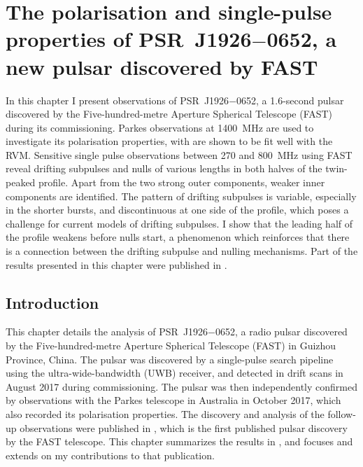 \chapter[The polarisation and single-pulse properties of \texorpdfstring{PSR~J1926$-$0652}{PSR~J12926--0652}]{The polarisation and single-pulse properties of \texorpdfstring{PSR~J1926$-$0652}{PSR~J12926--0652}, a new pulsar discovered by FAST}
\label{chapt: J1926}

In this chapter I present observations of PSR~J1926$-$0652, a 1.6-second pulsar discovered by the Five-hundred-metre Aperture Spherical Telescope (FAST) during its commissioning. Parkes observations at 1400~MHz are used to investigate its polarisation properties, with are shown to be fit well with the RVM. Sensitive single pulse observations between 270 and 800~MHz using FAST reveal drifting subpulses and nulls of various lengths in both halves of the twin-peaked profile. Apart from the two strong outer components, weaker inner components are identified.  The pattern of drifting subpulses is variable, especially in the shorter bursts, and discontinuous at one side of the profile, which poses a challenge for current models of drifting subpulses. I show that the leading half of the profile weakens before nulls start, a phenomenon which reinforces that there is a connection between the drifting subpulse and nulling mechanisms. Part of the results presented in this chapter were published in \citet{ZLH+2019}.

\section{Introduction}
\label{sec: J1926 - intro}

This chapter details the analysis of PSR~J1926$-$0652, a radio pulsar discovered by the Five-hundred-metre Aperture Spherical Telescope (FAST) in Guizhou Province, China. The pulsar was discovered by a single-pulse search pipeline \citep{ZBM+2014} using the ultra-wide-bandwidth (UWB) receiver, and detected in drift scans in August 2017 during commissioning. The pulsar was then independently confirmed by observations with the Parkes telescope in Australia in October 2017, which also recorded its polarisation properties. The discovery and analysis of the follow-up observations were published in \citet{ZLH+2019}, which is the first published pulsar discovery by the FAST telescope. This chapter summarizes the results in \citet{ZLH+2019}, and focuses and extends on my contributions to that publication.


